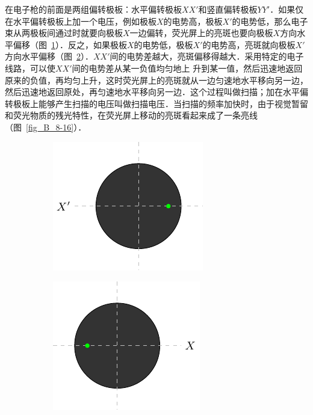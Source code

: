 在电子枪的前面是两组偏转极板：水平偏转极板$XX'$和竖直偏转极板$YY'$．如果仅在水平偏转极板上加一个电压，例如极板$X$的电势高，极板$X'$的电势低，那么电子束从两极板间通过时就要向极板$X$一边偏转，荧光屏上的亮斑也要向极板$X$方向水平偏移（图~\ref{fig_B_8-15a}）．反之，如果极板$X$的电势低，极板$X'$的电势高，亮斑就向极板$X'$方向水平偏移（图~\ref{fig_B_8-15b}）．$XX'$间的电势差越大，亮斑偏移得越大．采用特定的电子线路，可以使$XX'$间的电势差从某一负值均匀地上
升到某一值，然后迅速地返回原来的负值，再均匀上升，这时荧光屏上的亮斑就从一边匀速地水平移向另一边，然后迅速地返回原处，再匀速地水平移向另一边．这个过程叫做扫描；加在水平偏转极板上能够产生扫描的电压叫做扫描电压．当扫描的频率加快时，由于视觉暂留和荧光物质的残光特性，在荧光屏上移动的亮斑看起来成了一条亮线（图~\ref{fig_B_8-16}）．
\begin{figure}[htbp]
    \centering
    \begin{minipage}[b]{0.48\textwidth}
    \centering
    \begin{subfigure}{0.45\linewidth}
        \centering
        \includegraphics{fig/B/8-15a.pdf}
        \caption{}\label{fig_B_8-15a}
    \end{subfigure}
    \hfill
    \begin{subfigure}{0.45\linewidth}
        \centering
        \includegraphics{fig/B/8-15b.pdf}
        \caption{}\label{fig_B_8-15b}
    \end{subfigure}
    \caption{}\label{fig_B_8-15}
    \end{minipage}

\end{figure}
